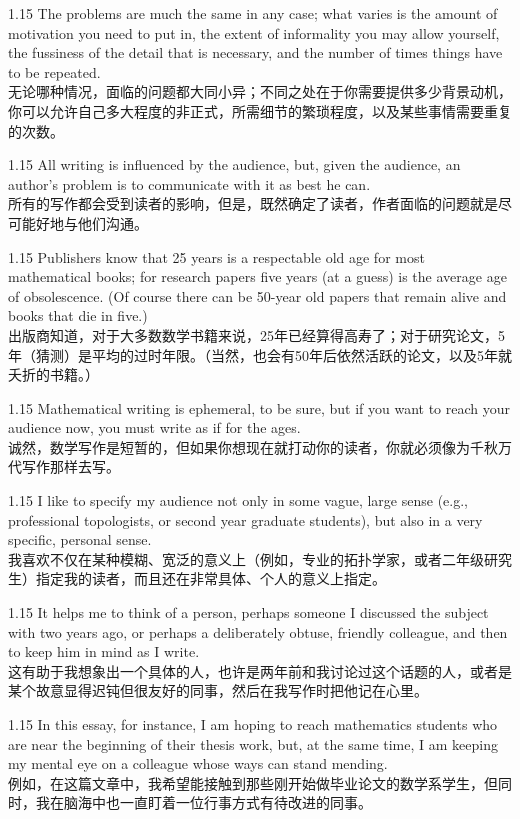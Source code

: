 \documentclass[12pt,a4paper]{article}
\newcommand{\bilingual}[2]{
    \begin{spacing}{1.15} %
        \noindent \normalsize #1 \\[-0.5ex] %
        \small \textcolor{blue!70!black}{#2} %
    \end{spacing}
    \vspace{0.8em} %
}
\begin{document}
\bilingual{The problems are much the same in any case; what varies is the amount of motivation you need to put in, the extent of informality you may allow yourself, the fussiness of the detail that is necessary, and the number of times things have to be repeated.}
{无论哪种情况，面临的问题都大同小异；不同之处在于你需要提供多少背景动机，你可以允许自己多大程度的非正式，所需细节的繁琐程度，以及某些事情需要重复的次数。} %

\bilingual{All writing is influenced by the audience, but, given the audience, an author's problem is to communicate with it as best he can.}
{所有的写作都会受到读者的影响，但是，既然确定了读者，作者面临的问题就是尽可能好地与他们沟通。} %

\bilingual{Publishers know that 25 years is a respectable old age for most mathematical books; for research papers five years (at a guess) is the average age of obsolescence. (Of course there can be 50-year old papers that remain alive and books that die in five.)}
{出版商知道，对于大多数数学书籍来说，25年已经算得高寿了；对于研究论文，5年（猜测）是平均的过时年限。（当然，也会有50年后依然活跃的论文，以及5年就夭折的书籍。）} %

\bilingual{Mathematical writing is ephemeral, to be sure, but if you want to reach your audience now, you must write as if for the ages.}
{诚然，数学写作是短暂的，但如果你想现在就打动你的读者，你就必须像为千秋万代写作那样去写。} %

\bilingual{I like to specify my audience not only in some vague, large sense (e.g., professional topologists, or second year graduate students), but also in a very specific, personal sense.}
{我喜欢不仅在某种模糊、宽泛的意义上（例如，专业的拓扑学家，或者二年级研究生）指定我的读者，而且还在非常具体、个人的意义上指定。} %

\bilingual{It helps me to think of a person, perhaps someone I discussed the subject with two years ago, or perhaps a deliberately obtuse, friendly colleague, and then to keep him in mind as I write.}
{这有助于我想象出一个具体的人，也许是两年前和我讨论过这个话题的人，或者是某个故意显得迟钝但很友好的同事，然后在我写作时把他记在心里。} %

\bilingual{In this essay, for instance, I am hoping to reach mathematics students who are near the beginning of their thesis work, but, at the same time, I am keeping my mental eye on a colleague whose ways can stand mending.}
{例如，在这篇文章中，我希望能接触到那些刚开始做毕业论文的数学系学生，但同时，我在脑海中也一直盯着一位行事方式有待改进的同事。} %
\end{document}
